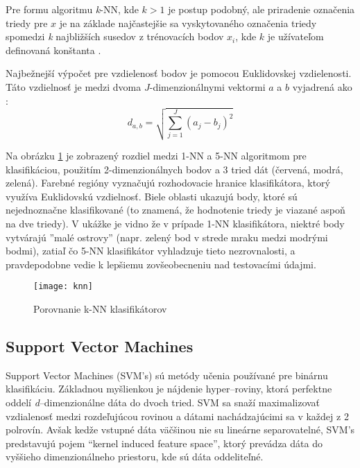 Pre formu algoritmu \textit{k}-NN, kde $k > 1$ je postup podobný, ale priradenie označenia triedy pre $x$ je na základe najčastejšie sa vyskytovaného označenia triedy
spomedzi \textit{k} najbližších susedov z trénovacích bodov $x_i$, kde $k$ je užívateľom definovaná konštanta \cite{prop:KnnClassification}.

Najbežnejší výpočet pre vzdielenosť bodov je pomocou Euklidovskej vzdielenosti.
Táto vzdielnosť je medzi dvoma $J$-dimenzionálnymi vektormi $a$ a $b$ vyjadrená ako \cite{prop:KnnClassification}:
\begin{equation}
    \label{eq:euclidMetric}
    d_{a,b} = \sqrt{\sum_{j=1}^{J}{(a_j - b_j)^2}}
\end{equation}

Na obrázku \ref{pic:kNN} je zobrazený rozdiel medzi 1-NN a 5-NN algoritmom pre klasifikáciou,
    použitím 2-dimenzionálnych bodov a 3 tried dát (červená, modrá, zelená).
Farebné regióny vyznačujú rozhodovacie hranice klasifikátora, ktorý využíva Euklidovskú vzdielnosť.
Biele oblasti ukazujú body, ktoré sú nejednoznačne klasifikované (to znamená, že hodnotenie triedy je viazané aspoň na dve triedy).
V ukážke je vidno že v prípade 1-NN klasifikátora, niektré body vytvárajú ''malé ostrovy''
    (napr. zelený bod v strede mraku medzi modrými bodmi), zatiaľ čo 5-NN klasifikátor vyhladzuje tieto nezrovnalosti,
    a pravdepodobne vedie k lepšiemu zovšeobecneniu nad testovacími údajmi.

\begin{figure}[H]
	\centering
	\texttt{[image: knn]}
	\caption{Porovnanie k-NN klasifikátorov\cite{odkaz:KnnImage}}
	\label{pic:kNN}
\end{figure}


\subsection{Support Vector Machines}
Support Vector Machines (SVM's) sú metódy učenia používané pre binárnu klasifikáciu.
Základnou myšlienkou je nájdenie hyper--roviny, ktorá perfektne oddelí \textit{d}--dimenzionálne dáta do dvoch tried\cite{prop:IntroductionToSVM}.
SVM sa snaží maximalizovať vzdialenosť medzi rozdeľujúcou rovinou a dátami nachádzajúcimi sa v každej z 2 polrovín\cite{prop:SupervisedMachineLearning}.
Avšak kedže vstupné dáta väčšinou nie su lineárne separovatelné, SVM's predstavujú pojem “kernel induced feature space”,
    ktorý prevádza dáta do vyššieho dimenzionálneho priestoru, kde sú dáta oddeliteľné.\cite{prop:IntroductionToSVM}

